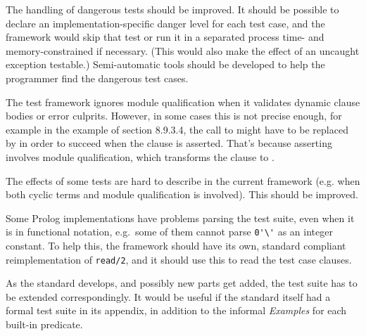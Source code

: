 \documentclass[draft]{llncs}%
\newif\ifDraft \Draftfalse
\begin{document}
The handling of dangerous tests should be improved. It should be possible to
declare an implementation-specific danger level for
each test case, and the framework would skip that test or run it in a
separated process time- and memory-constrained if necessary.
(This would also
make the effect of an uncaught exception testable.)
Semi-automatic tools should be developed to help the programmer find the
dangerous test cases.

The test framework ignores module qualification when it
validates dynamic clause bodies or error culprits. However, in some cases
this is not precise enough, for example in the example of section 8.9.3.4,
the call to  might have to
be replaced by  in order to
succeed when the clause  is asserted.
That's because asserting involves module qualification, which transforms the
clause to  .

The effects of
some tests are hard to describe in the current framework (e.g. when both
cyclic terms and module qualification is involved). This should be improved.

Some Prolog implementations have problems parsing the test suite, even when
it is in functional notation, e.g.\ some of them cannot parse
\verb+0'\'+ as an integer constant. To help this, the framework should have
its own, standard compliant reimplementation of \verb+read/2+, and it should
use this to read the test case clauses.

As the standard develops, and possibly new parts get added, the test suite
has to be extended correspondingly. It would be useful if the standard itself
had a formal test suite in its appendix, in addition to the informal
\emph{Examples} for each built-in predicate.


\nocite{isoprolog95}
\nocite{isoprologbook}
\nocite{sicstus-manual}
\nocite{diaz00gnu}
\nocite{DBLP:conf_sac_DiazC00}
\nocite{Wielemaker:03b}
\nocite{swipl-manual}
\nocite{ciao-manual}
\nocite{yap-manual}
\nocite{seriously}
\nocite{validation} %
\nocite{executable}

\ifDraft
  
  
\else
\end{document}

